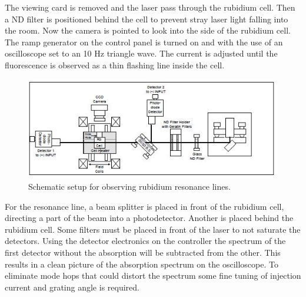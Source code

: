 The viewing card is removed and the laser pass through the rubidium cell. Then a ND filter is positioned behind the cell to prevent stray laser light falling into the room. 
Now the camera is pointed to look into the side of the rubidium cell.  The ramp generator on the control panel is turned on and with the use of an oscilloscope set to an 10 Hz triangle wave.  
The current is adjusted until the fluorescence is observed as a thin flashing line inside the cell.

\begin{figure}
    \includegraphics[width=\linewidth]{content/resonance_setup.jpg}
    \caption{Schematic setup for observing rubidium resonance lines.}
 \end{figure}

 For the resonance line, a beam splitter is placed in front of the rubidium cell, directing a part of the beam into a photodetector. Another is placed behind the 
rubidium cell. Some filters must be placed in front of the laser to not saturate the detectors. 
Using the detector electronics on the controller the spectrum of the first detector without the absorption will be subtracted from the other. This results in a clean picture of the absorption spectrum on the oscilloscope. To eliminate mode hops that could distort the spectrum some fine tuning of injection current and grating angle is required.